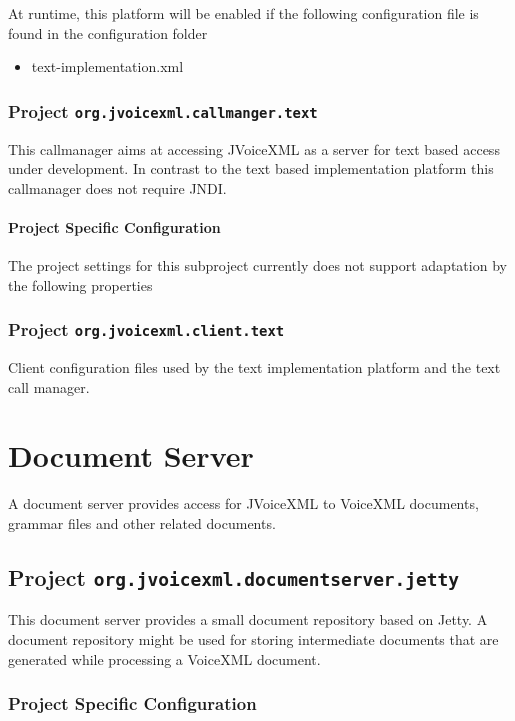 \documentclass[11pt,a4paper]{article}
\begin{document}
At runtime, this platform will be enabled if the following configuration file is found in the configuration
folder
\begin{itemize}
\item text-implementation.xml
\end{itemize}

\subsubsection{Project \texttt{org.jvoicexml.callmanger.text}}

This callmanager aims at accessing JVoiceXML as a server for text based
access under development. In contrast to the text based implementation platform this callmanager
does not require JNDI.

\paragraph{Project Specific Configuration}

The project settings for this subproject currently does not support adaptation by the following
properties

\subsubsection{Project \texttt{org.jvoicexml.client.text}}

Client configuration files used by the text implementation platform and the text call manager.

\section{Document Server}

A document server provides access for JVoiceXML to VoiceXML documents, grammar files and 
other related documents.

\subsection{Project \texttt{org.jvoicexml.documentserver.jetty}}

This document server provides a small document repository based on Jetty. A document repository 
might be used for storing intermediate documents that are generated while processing a VoiceXML document.

\subsubsection{Project Specific Configuration}
\end{document}
